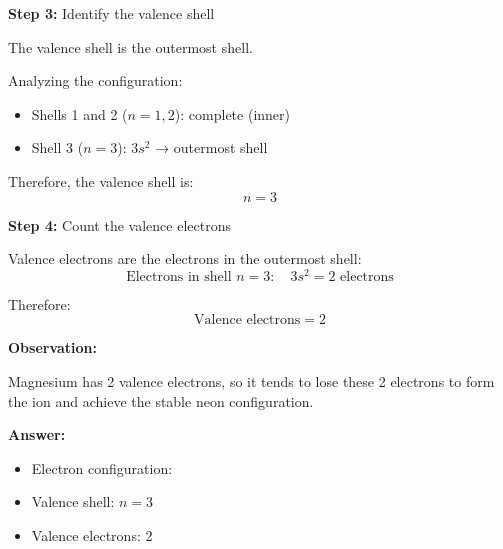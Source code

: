 \begin{exercise}
\begin{solu}
        \textbf{Step 3:} Identify the valence shell

        The valence shell is the outermost shell.

        Analyzing the configuration:
        \begin{itemize}
            \item Shells 1 and 2 (\(n = 1, 2\)): complete (inner)
            \item Shell 3 (\(n = 3\)): \(3s^2\) → outermost shell
        \end{itemize}

        Therefore, the valence shell is:
        \[
            \boxed{n = 3}
        \]

        \textbf{Step 4:} Count the valence electrons

        Valence electrons are the electrons in the outermost shell:
        \[
            \text{Electrons in shell } n = 3: \quad 3s^2 = 2 \text{ electrons}
        \]

        Therefore:
        \[
            \boxed{\text{Valence electrons} = 2}
        \]

        \textbf{Observation:}

        Magnesium has 2 valence electrons, so it tends to lose these 2 electrons to form the  ion and achieve the stable neon configuration.

        \textbf{Answer:}
        \begin{itemize}
            \item Electron configuration: 
            \item Valence shell: \(n = 3\)
            \item Valence electrons: 2
        \end{itemize}
    \end{solu}
\end{exercise}
